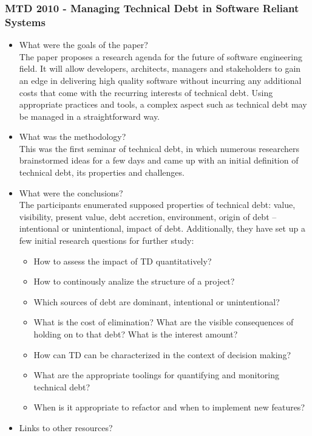\documentclass{mprop}
\begin{document}
\subsubsection{MTD 2010 - Managing Technical Debt in Software Reliant Systems} \cite{Brown2010}
\begin{itemize}
	\item What were the goals of the paper? \\
	      The paper proposes a research agenda for the future of software engineering field.
	      It will allow developers, architects, managers and stakeholders to gain an edge in delivering high quality software without incurring any additional costs that come with the recurring interests of technical debt.
	      Using appropriate practices and tools, a complex aspect such as technical debt may be managed in a straightforward way.
	\item What was the methodology? \\
	      This was the first seminar of technical debt, in which numerous researchers brainstormed ideas for a few days and came up with an initial definition of technical debt, its properties and challenges.
	\item What were the conclusions? \\
	      The participants enumerated supposed properties of technical debt: value, visibility, present value, debt accretion, environment, origin of debt – intentional or unintentional, impact of debt.
	      Additionally, they have set up a few initial research questions for further study:
	      \begin{itemize}
		      \item How to assess the impact of TD quantitatively?
		      \item How to continously analize the structure of a project?
		      \item Which sources of debt are dominant, intentional or unintentional?
		      \item What is the cost of elimination? What are the visible consequences of holding on to that debt? What is the interest amount?
		      \item How can TD can be characterized in the context of decision making?
		      \item What are the appropriate toolings for quantifying and monitoring technical debt?
		      \item When is it appropriate to refactor and when to implement new features?
	      \end{itemize}
	\item Links to other resources?
\end{itemize}
\end{document}
